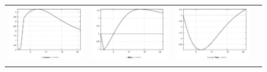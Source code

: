 \begin{figure}
\begin{tabular}{cccc}
\includegraphics[scale=0.22]{results_reinit/Investment_prefshock_irf.png} & 
\includegraphics[scale=0.22]{results_reinit/Inflation_prefshock_irf.png} & 
\includegraphics[scale=0.22]{results_reinit/Interest_Rate_prefshock_irf.png} \\ \\ 

\end{tabular}
\end{figure}
